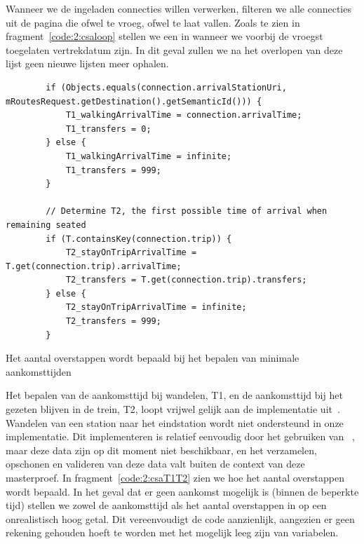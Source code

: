 Wanneer we de ingeladen connecties willen verwerken, filteren we alle connecties uit de pagina die ofwel te vroeg, ofwel te laat vallen. Zoals te zien in fragment~\ref{code:2:csaloop} stellen we een  in wanneer we voorbij de vroegst toegelaten vertrekdatum zijn. In dit geval zullen we na het overlopen van deze lijst geen nieuwe lijsten meer ophalen. 

\begin{listing}[htb]
	\begin{verbatim}
	 	if (Objects.equals(connection.arrivalStationUri, mRoutesRequest.getDestination().getSemanticId())) {
			T1_walkingArrivalTime = connection.arrivalTime;
			T1_transfers = 0;
		} else {
			T1_walkingArrivalTime = infinite;
			T1_transfers = 999;
		}

		// Determine T2, the first possible time of arrival when remaining seated
		if (T.containsKey(connection.trip)) {
			T2_stayOnTripArrivalTime = T.get(connection.trip).arrivalTime;
			T2_transfers = T.get(connection.trip).transfers;
		} else {
			T2_stayOnTripArrivalTime = infinite;
			T2_transfers = 999;
		}	
		\end{verbatim}
					\caption[CSA: Bepalen van aankomsttijden]{Het aantal overstappen wordt bepaald bij het bepalen van minimale aankomsttijden}
		\label{code:2:csaT1T2}
\end{listing}

Het bepalen van de aankomsttijd bij wandelen, T1, en de aankomsttijd bij het gezeten blijven in de trein, T2, loopt vrijwel gelijk aan de implementatie uit~\cite{strasser17}. Wandelen van een station naar het eindstation wordt niet ondersteund in onze implementatie. Dit implementeren is relatief eenvoudig door het gebruiken van ~\citep{strasser17,hannemann08}, maar deze data zijn op dit moment niet beschikbaar, en het verzamelen, opschonen en valideren van deze data valt buiten de context van deze masterproef. In fragment~\ref{code:2:csaT1T2} zien we hoe het aantal overstappen wordt bepaald. In het geval dat er geen aankomst mogelijk is (binnen de beperkte tijd) stellen we zowel de aankomsttijd als het aantal overstappen in op een onrealistisch hoog getal. Dit vereenvoudigt de code aanzienlijk, aangezien er geen rekening gehouden hoeft te worden met het mogelijk leeg zijn van variabelen.

